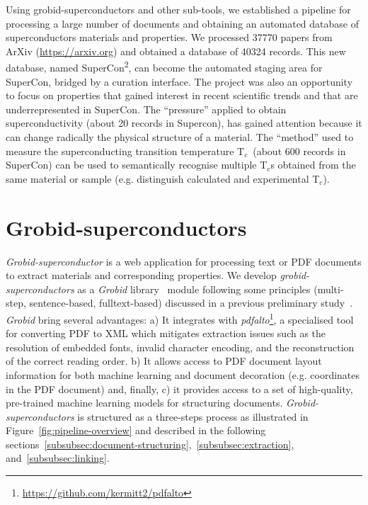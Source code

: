 \documentclass{article}
\newcommand{\tc}{T$_{c}$}
\begin{document}
Using grobid-superconductors and other sub-tools, we established a pipeline for processing a large number of documents and obtaining an automated database of superconductors materials and properties. 
We processed 37770 papers from ArXiv (\url{https://arxiv.org}) and obtained a database of 40324 records. 
This new database, named SuperCon\textsuperscript{2}, can become the automated staging area for SuperCon, bridged by a curation interface. 
The project was also an opportunity to focus on properties that gained interest in recent scientific trends and that are underrepresented in SuperCon. 
The ``pressure'' applied to obtain superconductivity (about 20 records in Supercon), has gained attention because it can change radically the physical structure of a material.
The ``method'' used to measure the superconducting transition temperature \tc~(about 600 records in SuperCon) can be used to semantically recognise multiple \tc s obtained from the same material or sample (e.g. distinguish calculated and experimental \tc). 

\section{Grobid-superconductors}

\textit{Grobid-superconductor} is a web application for processing text or PDF documents to extract materials and corresponding properties. 
We develop \textit{grobid-superconductors} as a \textit{Grobid} library~\cite{GROBID} module following some principles (multi-step, sentence-based, fulltext-based) discussed in a previous preliminary study~\cite{foppiano:hal-02870896}.  
\textit{Grobid} bring several advantages: a) It integrates with \textit{pdfalto}\footnote{\url{https://github.com/kermitt2/pdfalto}}, a specialised tool for converting PDF to XML which mitigates extraction issues such as the resolution of embedded fonts, invalid character encoding, and the reconstruction of the correct reading order. 
b) It allows access to PDF document layout information for both machine learning and document decoration (e.g. coordinates in the PDF document) and, finally, c) it provides access to a set of high-quality, pre-trained machine learning models for structuring documents.
\textit{Grobid-superconductors} is structured as a three-steps process as illustrated in Figure~\ref{fig:pipeline-overview} and described in the following sections~\ref{subsubsec:document-structuring},~\ref{subsubsec:extraction}, and~\ref{subsubsec:linking}.
\end{document}
